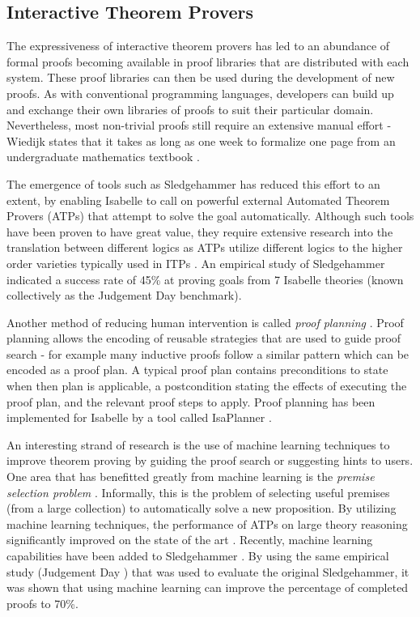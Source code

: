 \documentclass{llncs}
\begin{document}
\subsection{Interactive Theorem Provers}
The expressiveness of interactive theorem provers has led to an abundance of formal proofs becoming available in proof libraries that are distributed with each system. These proof libraries can then be used during the development of new proofs. As with conventional programming languages, developers can build up and exchange their own libraries of proofs to suit their particular domain. Nevertheless, most non-trivial proofs still require an extensive manual effort - Wiedijk states that it takes as long as one week to formalize one page from an undergraduate mathematics textbook \cite{Freek08}. 

The emergence of tools such as Sledgehammer \cite{Sledgehammer07} has reduced this effort to an extent, by enabling Isabelle to call on powerful external Automated Theorem Provers (ATPs) that attempt to solve the goal automatically. Although such tools have been proven to have great value, they require extensive research into the translation between different logics as ATPs utilize different logics to the higher order varieties typically used in ITPs \cite{Meng08}. An empirical study of Sledgehammer \cite{Bohme10} indicated a success rate of 45\% at proving goals from 7 Isabelle theories (known collectively as the Judgement Day benchmark).

Another method of reducing human intervention is called \emph{proof planning} \cite{Bundy88}. Proof planning allows the encoding of reusable strategies that are used to guide proof search - for example many inductive proofs follow a similar pattern which can be encoded as a proof plan. A typical proof plan contains preconditions to state when then plan is applicable, a postcondition stating the effects of executing the proof plan, and the relevant proof steps to apply. Proof planning has been implemented for Isabelle by a tool called IsaPlanner \cite{Dixon03}.

An interesting strand of research is the use of machine learning techniques to improve theorem proving by guiding the proof search or suggesting hints to users. One area that has benefitted greatly from machine learning is the \emph{premise selection problem} \cite{Alama11,Flyspeck12}. Informally, this is the problem of selecting useful premises (from a large collection) to automatically solve a new proposition. By utilizing machine learning techniques, the performance of ATPs on large theory reasoning significantly improved on the state of the art \cite{Kaliszyk13}. Recently, machine learning capabilities have been added to Sledgehammer \cite{Kuhlwein13}. By using the same empirical study (Judgement Day \cite{Bohme10}) that was used to evaluate the original Sledgehammer, it was shown that using machine learning can improve the percentage of completed proofs to 70\%.
\end{document}
